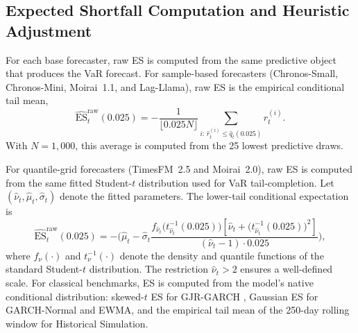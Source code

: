 \documentclass[preprint,11pt,authoryear]{elsarticle}
\newcommand{\ES}{\mathrm{ES}}
\newcommand{\1}{\boldsymbol{1}}
\begin{document}
\begin{table}[H]
\centering
\caption{Fissler--Ziegel FZ$_0$ joint VaR--ES
	scores (mean across 24 assets, $\alpha = 0.01$).
	Lower is better. The ES component uses the
	heuristic correction described below. Raw scores for
	high-$\bar R$ forecasters may be undefined or
	extreme due to severe miscalibration.}
\label{tab:fz_scores}
\footnotesize

\end{table}

\subsection{Expected Shortfall Computation and Heuristic Adjustment}
\label{app:es_raw}

For each base forecaster, raw ES is computed from the same predictive object
that produces the VaR forecast. For sample-based forecasters
(Chronos-Small, Chronos-Mini, Moirai~1.1, and Lag-Llama), raw ES is the
empirical conditional tail mean,
\begin{equation}
	\label{eq:app_raw_es_sample}
	\widehat{\ES}_t^{\mathrm{raw}}(0.025)
	=
	-\frac{1}{\lfloor 0.025 N\rfloor}
	\sum_{i:\,\hat r_t^{(i)}\le \hat q_t(0.025)}
	\hat r_t^{(i)}.
\end{equation}
With $N=1{,}000$, this average is computed from the 25 lowest predictive
draws.

For quantile-grid forecasters (TimesFM~2.5 and Moirai~2.0), raw ES is
computed from the same fitted Student-$t$ distribution used for VaR
tail-completion. Let $(\hat\nu_t,\hat\mu_t,\hat\sigma_t)$ denote the fitted
parameters. The lower-tail conditional expectation is
\begin{equation}
	\label{eq:app_raw_es_student}
	\widehat{\ES}_t^{\mathrm{raw}}(0.025)
	=
	-\Biggl(
	\hat\mu_t
	-
	\hat\sigma_t
	\frac{
		f_{\hat\nu_t}\bigl(t^{-1}_{\hat\nu_t}(0.025)\bigr)
		\left[
		\hat\nu_t+
		\bigl(t^{-1}_{\hat\nu_t}(0.025)\bigr)^2
		\right]
	}{
		(\hat\nu_t-1)\cdot 0.025
	}
	\Biggr),
\end{equation}
where $f_\nu(\cdot)$ and $t_\nu^{-1}(\cdot)$ denote the density and quantile
functions of the standard Student-$t$ distribution. The restriction
$\hat\nu_t>2$ ensures a well-defined scale.
For classical benchmarks, ES is computed from the model's native conditional
distribution: skewed-$t$ ES for GJR-GARCH
\citep{hansen1994autoregressive}, Gaussian ES for GARCH-Normal and EWMA,
and the empirical tail mean of the 250-day rolling window for Historical
Simulation.
\end{document}
